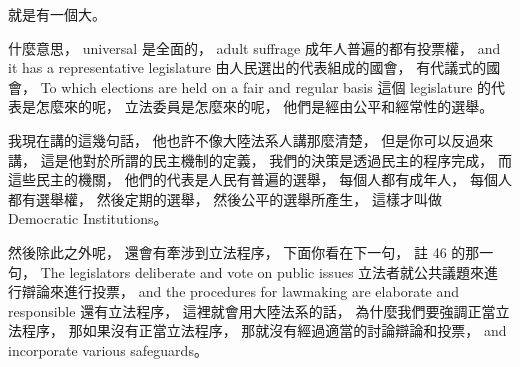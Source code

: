 \hypertarget{w06:cue:1335}{}就是有一個大。

\hypertarget{w06:cue:1336}{}什麼意思，
\hypertarget{w06:cue:1337}{}universal 是全面的，
\hypertarget{w06:cue:1338}{}adult suffrage
\hypertarget{w06:cue:1339}{}成年人普遍的都有投票權，
\hypertarget{w06:cue:1340}{}and it has a representative legislature
\hypertarget{w06:cue:1341}{}由人民選出的代表組成的國會，
\hypertarget{w06:cue:1342}{}有代議式的國會，
\hypertarget{w06:cue:1343}{}To which elections are held on a fair and regular basis
\hypertarget{w06:cue:1344}{}這個 legislature 的代表是怎麼來的呢，
\hypertarget{w06:cue:1345}{}立法委員是怎麼來的呢，
\hypertarget{w06:cue:1346}{}他們是經由公平和經常性的選舉。

\hypertarget{w06:cue:1347}{}我現在講的這幾句話，
\hypertarget{w06:cue:1348}{}他也許不像大陸法系人講那麼清楚，
\hypertarget{w06:cue:1349}{}但是你可以反過來講，
\hypertarget{w06:cue:1350}{}這是他對於所謂的民主機制的定義，
\hypertarget{w06:cue:1351}{}我們的決策是透過民主的程序完成，
\hypertarget{w06:cue:1352}{}而這些民主的機關，
\hypertarget{w06:cue:1353}{}他們的代表是人民有普遍的選舉，
\hypertarget{w06:cue:1354}{}每個人都有成年人，
\hypertarget{w06:cue:1355}{}每個人都有選舉權，
\hypertarget{w06:cue:1356}{}然後定期的選舉，
\hypertarget{w06:cue:1357}{}然後公平的選舉所產生，
\hypertarget{w06:cue:1358}{}這樣才叫做 Democratic Institutions。

\hypertarget{w06:cue:1359}{}然後除此之外呢，
\hypertarget{w06:cue:1360}{}還會有牽涉到立法程序，
\hypertarget{w06:cue:1361}{}下面你看在下一句，
\hypertarget{w06:cue:1362}{}註 46 的那一句，
\hypertarget{w06:cue:1363}{}The legislators deliberate and vote on public issues
\hypertarget{w06:cue:1364}{}立法者就公共議題來進行辯論來進行投票，
\hypertarget{w06:cue:1365}{}and the procedures for lawmaking are elaborate and responsible
\hypertarget{w06:cue:1366}{}還有立法程序，
\hypertarget{w06:cue:1367}{}這裡就會用大陸法系的話，
\hypertarget{w06:cue:1368}{}為什麼我們要強調正當立法程序，
\hypertarget{w06:cue:1369}{}那如果沒有正當立法程序，
\hypertarget{w06:cue:1370}{}那就沒有經過適當的討論辯論和投票，
\hypertarget{w06:cue:1371}{}and incorporate various safeguards。

